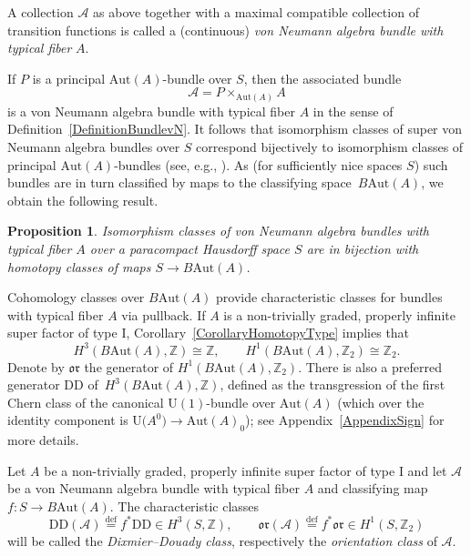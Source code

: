 \documentclass[10pt,a4paper]{amsart}
\numberwithin{equation}{section}
\newtheorem{Proposition}[Theorem]{Proposition}
\newcommand{\Z}{\mathbb{Z}}
\newcommand{\A}{\mathcal{A}}
\newcommand{\Aut}{\mathrm{Aut}}
\newcommand{\U}{\mathrm{U}}
\newcommand{\DD}{\mathrm{DD}}
\newcommand{\defeq}{\stackrel{\mathrm{def}}{=}}
\newcommand{\oclass}{\mathfrak{or}}
\begin{document}
\begin{Definition} \label{DefinitionBundlevN}
A collection $\A$ as above together with a maximal compatible collection of transition functions is called a (continuous) \emph{von Neumann algebra bundle with typical fiber} $A$.
\end{Definition}

If $P$ is a principal $\Aut(A)$-bundle over $S$, then the associated bundle
\begin{equation*}
\A = P \times_{\Aut(A)} A
\end{equation*}
 is a von Neumann algebra bundle with typical fiber $A$ in the sense of Definition~\ref{DefinitionBundlevN}.
It follows that isomorphism classes of super von Neumann algebra bundles over $S$ %
correspond bijectively to isomorphism classes of principal $\Aut(A)$-bundles (see, e.g., \cite[Section~4]{PennigWStarBundles}).
As (for sufficiently nice spaces $S$) such bundles are in turn classified by maps to the classifying space~$B\Aut(A)$, we obtain the following result.

\begin{Proposition} \label{PropositionClassifyingWStar}
 Isomorphism classes of von Neumann algebra bundles with typical fiber $A$ over a paracompact Hausdorff space $S$ are in bijection with homotopy classes of maps $S \to B\Aut(A)$.
\end{Proposition}

Cohomology classes over $B\Aut(A)$ provide characteristic classes for bundles with typical fiber $A$ via pullback.
If $A$ is a non-trivially graded, properly infinite super factor of type I,
Corollary~\ref{CorollaryHomotopyType} implies that
\begin{equation*}
 H^3(B\Aut(A), \Z) \cong \Z, \qquad H^1(B\Aut(A), \Z_2) \cong \Z_2.
\end{equation*}
Denote by $\oclass$ the generator of $H^1(B\Aut(A), \Z_2)$.
There is also a preferred generator $\DD$ of~$H^3(B\Aut(A), \Z)$, defined as the transgression of the first Chern class of the canonical $\U(1)$-bundle over $\Aut(A)$ (which over the identity component is $\U\big(A^0\big) \to \Aut(A)_0$);
see Appendix~\ref{AppendixSign} for more details.

\begin{Definition} \label{DefinitionCharacteristicClasses}
Let $A$ be a non-trivially graded, properly infinite super factor of type I and let $\A$ be a von Neumann algebra bundle with typical fiber $A$ and classifying map $f\colon S \to B\Aut(A)$.
The characteristic classes
\begin{equation*}
 \DD(\A) \defeq f^* \DD \in H^3(S, \Z), \qquad \oclass(\A) \defeq f^*\oclass \in H^1(S, \Z_2)
\end{equation*}
will be called the \emph{Dixmier--Douady class}, respectively the \emph{orientation class} of $\mathcal{A}$.
\end{Definition}
\end{document}
